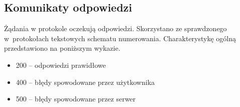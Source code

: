 \subsection{Komunikaty odpowiedzi}
Żądania w protokole oczekują odpowiedzi. Skorzystano ze sprawdzonego
w~protokołach tekstowych schematu numerowania. Charakterystykę ogólną
przedstawiono na poniższym wykazie.
\begin{itemize}
	\item 200 -- odpowiedzi prawidłowe
	\item 400 -- błędy spowodowane przez użytkownika
	\item 500 -- błędy spowodowane przez serwer
\end{itemize}
